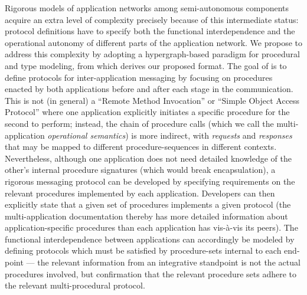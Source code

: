 \documentclass[11pt,letterpaper]{article}
\newcommand{\visavis}{vis-\`a-vis}
\newcommand{\ATextCClr}[1]{\textcolor{atcColor}{\textbf{#1}}}
\newcommand{\HMCL}{{\resizebox{!}{7.5pt}{\ATextCClr{HMCL}}}}
\newcommand{\p}[1]{

\vspace{1em}#1}
\newcommand{\q}[1]{{\fontfamily{qcr}\selectfont ``}#1{\fontfamily{qcr}\selectfont ''}}
\begin{document}
{\p{Rigorous models of application networks among semi-autonomous 
components acquire an extra level of complexity precisely 
because of this intermediate status: protocol definitions 
have to specify both the functional interdependence 
and the operational autonomy of different parts of 
the application network.  We propose to 
address this complexity by adopting a hypergraph-based 
paradigm for procedural and type modeling, from 
which derives our proposed \HMCL{} format.  
The goal of \HMCL{} is to define protocols for 
inter-application messaging by focusing on 
procedures enacted by both applications before and 
after each stage in the communication.  This 
is not (in general) a \q{Remote Method Invocation} 
or \q{Simple Object Access Protocol} where one 
application explicitly initiates a specific procedure 
for the second to perform; instead, the chain of 
procedure calls (which we call the multi-application
\textit{operational semantics}) is more indirect, 
with \textit{requests} and \textit{responses} that 
may be mapped to different procedure-sequences in 
different contexts.  Nevertheless, although 
one application does not need detailed 
knowledge of the other's internal procedure 
signatures (which would break encapsulation), 
a rigorous messaging protocol can be developed 
by specifying requirements on the relevant 
procedures implemented by each application.  
Developers can then explicitly state that 
a given set of procedures implements a given 
\HMCL{} protocol (the multi-application documentation 
thereby has more detailed information about 
application-specific procedures than each 
application has \visavis{} its peers).  The 
functional interdependence between applications can 
accordingly be modeled by defining protocols which 
must be satisfied by procedure-sets internal 
to each end-point --- the relevant information 
from an integrative standpoint is not the 
actual procedures involved, but confirmation 
that the relevant procedure sets adhere 
to the relevant multi-procedural protocol.}

}
\end{document}
